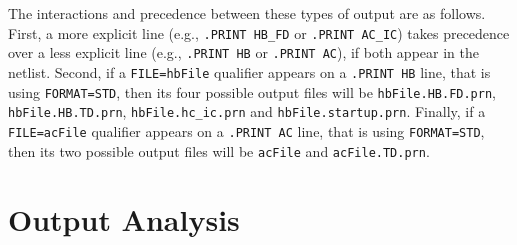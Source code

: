 {{The interactions and precedence between these types of output are as follows.  
First, a more explicit line (e.g., \texttt{.PRINT HB\_FD} or 
\texttt{.PRINT AC\_IC}) takes precedence over a less explicit line (e.g., 
\texttt{.PRINT HB} or \texttt{.PRINT AC}), if both appear in the netlist.
Second, if a \texttt{FILE=hbFile} qualifier appears on a \texttt{.PRINT HB}
line, that is using \texttt{FORMAT=STD}, then its four possible output files 
will be \texttt{hbFile.HB.FD.prn}, \texttt{hbFile.HB.TD.prn},
\texttt{hbFile.hc\_ic.prn} and \texttt{hbFile.startup.prn}.  Finally, if a
\texttt{FILE=acFile} qualifier appears on a \texttt{.PRINT AC} line, that 
is using \texttt{FORMAT=STD}, then its two possible output files will 
be \texttt{acFile} and \texttt{acFile.TD.prn}.    
  
\section{Output Analysis}
\label{Output_Analysis}

}}
